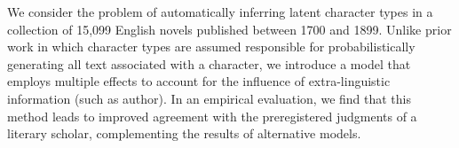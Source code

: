 We consider the problem of automatically inferring latent character types in a collection of 15,099 English novels published between 1700 and 1899. Unlike prior work in which character types are assumed responsible for probabilistically generating all text associated with a character, we introduce a model that employs multiple effects to account for the influence of extra-linguistic information (such as author).                            In an empirical evaluation, we find that this method leads to improved agreement with the preregistered judgments of a literary scholar, complementing the results of alternative models.
